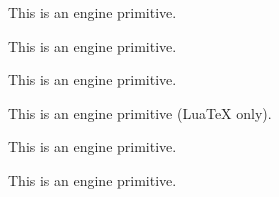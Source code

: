 \begin{function}[]
  {
    \count@
  }
  \begin{syntax}
  \end{syntax}

\end{function}



\begin{function}[]
  {
    \cr
  }
  \begin{syntax}
  \end{syntax}
  This is an engine primitive.
\end{function}



\begin{function}[]
  {
    \crcr
  }
  \begin{syntax}
  \end{syntax}
  This is an engine primitive.
\end{function}



\begin{function}[]
  {
    \csname
  }
  \begin{syntax}
  \end{syntax}
  This is an engine primitive.
\end{function}



\begin{function}[]
  {
    \csstring
  }
  \begin{syntax}
  \end{syntax}
  This is an engine primitive (Lua\TeX{} only).
\end{function}



\begin{function}[]
  {
    \currentgrouplevel
  }
  \begin{syntax}
  \end{syntax}
  This is an engine primitive.
\end{function}



\begin{function}[]
  {
    \currentgrouptype
  }
  \begin{syntax}
  \end{syntax}
  This is an engine primitive.
\end{function}



